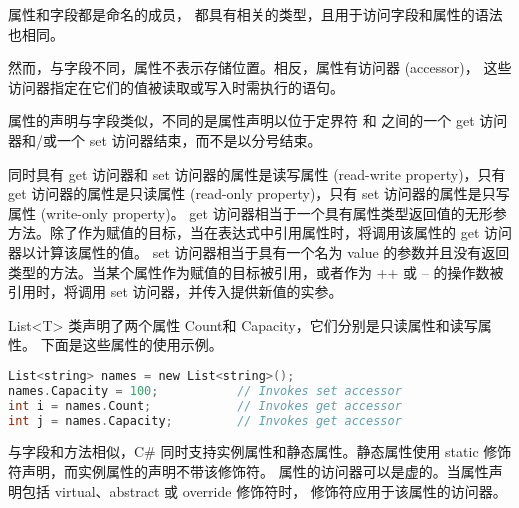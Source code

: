 属性和字段都是命名的成员，
都具有相关的类型，且用于访问字段和属性的语法也相同。

然而，与字段不同，属性不表示存储位置。相反，属性有访问器 (accessor)，
这些访问器指定在它们的值被读取或写入时需执行的语句。

属性的声明与字段类似，不同的是属性声明以位于定界符 { 和 } 之间的一个 get 访问器和/或一个 set 访问器结束，而不是以分号结束。

同时具有 get 访问器和 set 访问器的属性是读写属性 (read-write property)，只有 get 访问器的属性是只读属性 (read-only property)，只有 set 访问器的属性是只写属性 (write-only property)。
get 访问器相当于一个具有属性类型返回值的无形参方法。除了作为赋值的目标，当在表达式中引用属性时，将调用该属性的 get 访问器以计算该属性的值。
set 访问器相当于具有一个名为 value 的参数并且没有返回类型的方法。当某个属性作为赋值的目标被引用，或者作为 ++ 或 -- 的操作数被引用时，将调用 set 访问器，并传入提供新值的实参。

List<T> 类声明了两个属性 Count和 Capacity，它们分别是只读属性和读写属性。
下面是这些属性的使用示例。

 \begin{lstlisting}[language=C]
List<string> names = new List<string>();
names.Capacity = 100;           // Invokes set accessor
int i = names.Count;            // Invokes get accessor
int j = names.Capacity;         // Invokes get accessor
 \end{lstlisting}

与字段和方法相似，C\# 同时支持实例属性和静态属性。静态属性使用 static 修饰符声明，而实例属性的声明不带该修饰符。
属性的访问器可以是虚的。当属性声明包括 virtual、abstract 或 override 修饰符时，
修饰符应用于该属性的访问器。



